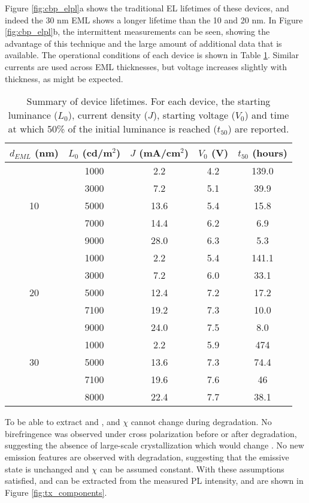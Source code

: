\documentclass[../thesis.tex]{subfiles}
\begin{document}
Figure \ref{fig:cbp_elpl}a shows the traditional EL lifetimes of these devices, and indeed the 30 nm EML shows a longer lifetime than the 10 and 20 nm.  
In Figure \ref{fig:cbp_elpl}b, the intermittent \pl measurements can be seen, showing the advantage of this technique and the large amount of additional data that is available.
The operational conditions of each device is shown in Table \ref{tab:lifetime_summary}.
Similar currents are used across EML thicknesses, but voltage increases slightly with thickness, as might be expected.

\begin{table}[hb]
\centering
\begin{tabular}{c|c|c|c|c}
$d_{EML}$ (nm) & $L_0$ (cd/m$^2$) & $J$ (mA/cm$^2$) & $V_0$ (V) & $t_{50}$ (hours) \\
\hline
& 1000 & 2.2 & 4.2 & 139.0 \\
& 3000 & 7.2 & 5.1 & 39.9 \\
10 & 5000 & 13.6 & 5.4 & 15.8 \\
& 7000 & 14.4 & 6.2 & 6.9 \\
& 9000 & 28.0 &  6.3 & 5.3 \\
\hline
& 1000 & 2.2 & 5.4 & 141.1 \\
& 3000 & 7.2 & 6.0 & 33.1 \\
20 & 5000 & 12.4 & 7.2 & 17.2 \\
& 7100 & 19.2 & 7.3 & 10.0 \\
& 9000 & 24.0 &  7.5 & 8.0 \\
\hline
& 1000 & 2.2 & 5.9 & 474 \\
30 & 5000 & 13.6 & 7.3 & 74.4\\
& 7100 & 19.6 & 7.6 & 46 \\
& 8000 & 22.4 &  7.7 & 38.1 \\

\end{tabular}
\caption{Summary of device lifetimes.  For each device, the starting luminance ($L_0$), current density ($J$), starting voltage ($V_0$) and time at which 50\% of the initial luminance is reached ($t_{50}$) are reported.}
\label{tab:lifetime_summary}
\end{table}

To be able to extract \pl and \ef, \oc and $\chi$ cannot change during degradation.
No birefringence was observed under cross polarization before or after degradation, suggesting the absence of large-scale crystallization which would change \oc .  
No new emission features are observed with degradation, suggesting that the emissive state is unchanged and $\chi$ can be assumed constant.
With these assumptions satisfied, \pl and \ef can be extracted from the measured PL intensity, and are shown in Figure \ref{fig:tx_components}.
\end{document}
